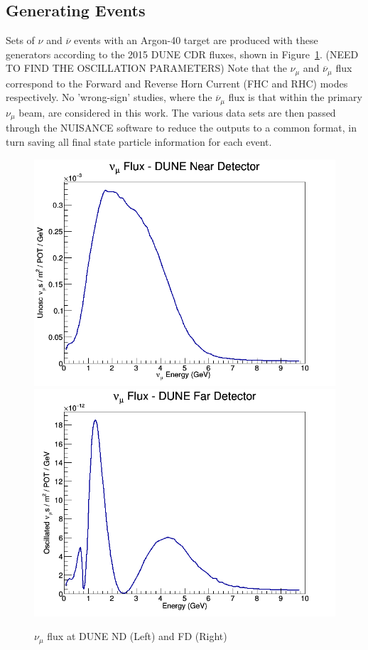 \documentclass[12pt]{article}
\begin{document}
\subsection{Generating Events}
\label{subsec:events}
Sets of $\nu$ and $\overline{\nu}$ events with an Argon-40 target are produced with these generators according to the 2015 DUNE CDR fluxes, shown in Figure~\ref{fig:dune_flux}. (NEED TO FIND THE OSCILLATION PARAMETERS) Note that the $\nu_\mu$ and $\overline{\nu}_\mu$ flux correspond to the Forward and Reverse Horn Current (FHC and RHC) modes respectively. No 'wrong-sign' studies, where the $\overline{\nu}_\mu$ flux is that within the primary $\nu_\mu$ beam, are considered in this work. The various data sets are then passed through the NUISANCE\cite{NUISANCE} software to reduce the outputs to a common format, in turn saving all final state particle information for each event. 
\begin{figure}[h]
\centering
{}
\includegraphics[width=\linewidth]{Dune_Flux/numu_ND_flux.png}
\endminipage
{}
\includegraphics[width=\linewidth]{Dune_Flux/numu_FD_flux.png}
\endminipage
\caption{$\nu_\mu$ flux at DUNE ND (Left) and FD (Right)}
\label{fig:dune_flux}
\end{figure}
\FloatBarrier
\end{document}
